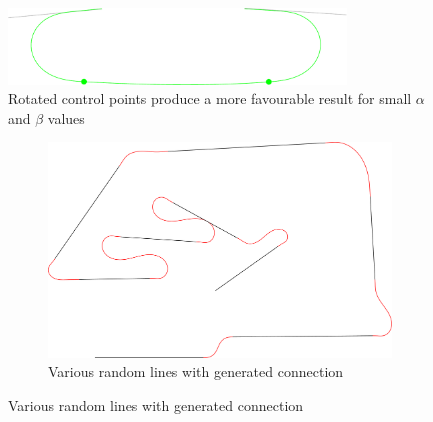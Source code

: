 \begin{figure}
\centering
\includegraphics[width=0.8\textwidth]{images/smooth/tangents_infty_rotated.pdf}
\caption{Rotated control points produce a more favourable result for small $\alpha$ and $\beta$ values}\label{fig:conn_infty_rot}
\end{figure}	

\begin{figure}
\centering
\begin{subfigure}[b]{0.8\textwidth}
\includegraphics[width=\textwidth]{images/smooth/smooth_connections_1.pdf}
\caption{Various random lines with generated connection}
\end{subfigure}
\par \bigskip


\end{figure}
